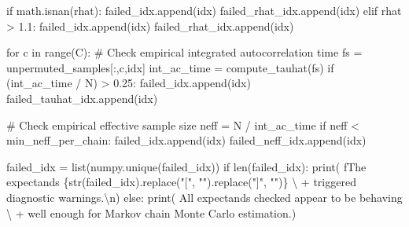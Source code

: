 \documentclass[
  letterpaper,
  DIV=11,
  numbers=noendperiod]{scrartcl}
\newenvironment{Shaded}{\begin{snugshade}}{\end{snugshade}}
\newcommand{\BuiltInTok}[1]{\textcolor[rgb]{0.00,0.23,0.31}{#1}}
\newcommand{\CharTok}[1]{\textcolor[rgb]{0.13,0.47,0.30}{#1}}
\newcommand{\CommentTok}[1]{\textcolor[rgb]{0.37,0.37,0.37}{#1}}
\newcommand{\ControlFlowTok}[1]{\textcolor[rgb]{0.00,0.23,0.31}{#1}}
\newcommand{\FloatTok}[1]{\textcolor[rgb]{0.68,0.00,0.00}{#1}}
\newcommand{\KeywordTok}[1]{\textcolor[rgb]{0.00,0.23,0.31}{#1}}
\newcommand{\NormalTok}[1]{\textcolor[rgb]{0.00,0.23,0.31}{#1}}
\newcommand{\OperatorTok}[1]{\textcolor[rgb]{0.37,0.37,0.37}{#1}}
\newcommand{\SpecialCharTok}[1]{\textcolor[rgb]{0.37,0.37,0.37}{#1}}
\newcommand{\SpecialStringTok}[1]{\textcolor[rgb]{0.13,0.47,0.30}{#1}}
\newcommand{\StringTok}[1]{\textcolor[rgb]{0.13,0.47,0.30}{#1}}
\begin{document}
\begin{Shaded}
\begin{Highlighting}[]
    \ControlFlowTok{if}\NormalTok{ math.isnan(rhat):}
\NormalTok{      failed\_idx.append(idx)}
\NormalTok{      failed\_rhat\_idx.append(idx)}
    \ControlFlowTok{elif}\NormalTok{ rhat }\OperatorTok{\textgreater{}} \FloatTok{1.1}\NormalTok{:}
\NormalTok{      failed\_idx.append(idx)}
\NormalTok{      failed\_rhat\_idx.append(idx)}
    
    \ControlFlowTok{for}\NormalTok{ c }\KeywordTok{in} \BuiltInTok{range}\NormalTok{(C):}
      \CommentTok{\# Check empirical integrated autocorrelation time}
\NormalTok{      fs }\OperatorTok{=}\NormalTok{ unpermuted\_samples[:,c,idx]}
\NormalTok{      int\_ac\_time }\OperatorTok{=}\NormalTok{ compute\_tauhat(fs)}
      \ControlFlowTok{if}\NormalTok{ (int\_ac\_time }\OperatorTok{/}\NormalTok{ N) }\OperatorTok{\textgreater{}} \FloatTok{0.25}\NormalTok{:}
\NormalTok{        failed\_idx.append(idx)}
\NormalTok{        failed\_tauhat\_idx.append(idx)}
      
      \CommentTok{\# Check empirical effective sample size}
\NormalTok{      neff }\OperatorTok{=}\NormalTok{ N }\OperatorTok{/}\NormalTok{ int\_ac\_time}
      \ControlFlowTok{if}\NormalTok{ neff }\OperatorTok{\textless{}}\NormalTok{ min\_neff\_per\_chain:}
\NormalTok{        failed\_idx.append(idx)}
\NormalTok{        failed\_neff\_idx.append(idx)}
  
\NormalTok{  failed\_idx }\OperatorTok{=} \BuiltInTok{list}\NormalTok{(numpy.unique(failed\_idx))}
  \ControlFlowTok{if} \BuiltInTok{len}\NormalTok{(failed\_idx):}
    \BuiltInTok{print}\NormalTok{( }\SpecialStringTok{f\textquotesingle{}The expectands }\SpecialCharTok{\{}\BuiltInTok{str}\NormalTok{(failed\_idx)}\SpecialCharTok{.}\NormalTok{replace(}\StringTok{"["}\NormalTok{, }\StringTok{""}\NormalTok{)}\SpecialCharTok{.}\NormalTok{replace(}\StringTok{"]"}\NormalTok{, }\StringTok{""}\NormalTok{)}\SpecialCharTok{\}}\SpecialStringTok{\textquotesingle{}}\NormalTok{ \textbackslash{}}
          \OperatorTok{+} \StringTok{\textquotesingle{} triggered diagnostic warnings.}\CharTok{\textbackslash{}n}\StringTok{\textquotesingle{}}\NormalTok{)}
  \ControlFlowTok{else}\NormalTok{:}
    \BuiltInTok{print}\NormalTok{(  }\StringTok{\textquotesingle{}All expectands checked appear to be behaving\textquotesingle{}}\NormalTok{ \textbackslash{}}
          \OperatorTok{+} \StringTok{\textquotesingle{}well enough for Markov chain Monte Carlo estimation.\textquotesingle{}}\NormalTok{)}
  

\end{Highlighting}
\end{Shaded}
\end{document}
